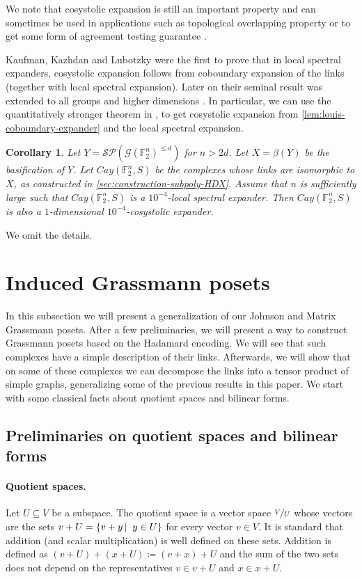 \documentclass[10pt,a4paper]{article}
\newcommand{\prettyref}[1]{\cref{#1}}
\newtheorem{corollary}[theorem]{Corollary}
\theoremstyle{definition}
\theoremstyle{remark}
\newcommand\sett[2]{\left\{ #1 \left| \; \vphantom{#1 #2} \right. #2  \right\}}
\newcommand{\F}{\mathbb{F}}
\renewcommand{\leq}{\leqslant}
\numberwithin{equation}{section}
\let\origparagraph\paragraph
\renewcommand{\paragraph}[1]{\origparagraph{#1.}}
\let\pref=\prettyref
\def\Y{Y}
\def\M{\mathcal{SP}}
\begin{document}
    We note that cosystolic expansion is still an important property and can sometimes be used in applications such as topological overlapping property \cite{DotterrerKW2018} or to get some form of agreement testing guarantee \cite{DiksteinD2023agr}.

Kaufman, Kazhdan and Lubotzky were the first to prove that in local spectral expanders, cosystolic expansion follows from coboundary expansion of the links \cite{KaufmanKL2016} (together with local spectral expansion). Later on their seminal result was extended to all groups and higher dimensions \cite{EvraK2016,KaufmanM2018,KaufmanM2021,KaufmanM2022,DiksteinD2023cbdry}. In particular, we can use the quantitatively stronger theorem in \cite[Theorem 1.2]{DiksteinD2023cbdry}, to get cosystolic expansion from \pref{lem:louis-coboundary-expander} and the local spectral expansion.
\begin{corollary}
    Let \(\Y=\M(\mathcal{G}(\F_2^n)^{\leq d})\) for \(n > 2d\). Let \(X = \beta(\Y)\) be the basification of \(Y\). Let \(Cay(\F_2^n,S)\) be the complexes whose links are isomorphic to \(X\), as constructed in \pref{sec:construction-subpoly-HDX}. Assume that \(n\) is sufficiently large such that \(Cay(\F_2^n,S)\) is a \(10^{-4}\)-local spectral expander. Then \(Cay(\F_2^n,S)\) is also a $1$-dimensional \(10^{-4}\)-cosystolic expander.
\end{corollary}
We omit the details.
 

\section{Induced Grassmann posets} \label{sec:induced-Grassmann}
In this subsection we will present a generalization of our Johnson and Matrix Grassmann posets. After a few preliminaries, we will present a way to construct Grassmann posets based on the Hadamard encoding. We will see that such complexes have a simple description of their links. Afterwards, we will show that on some of these complexes we can decompose the links into a tensor product of simple graphs, generalizing some of the previous results in this paper. We start with some classical facts about quotient spaces and bilinear forms. 
\subsection{Preliminaries on quotient spaces and bilinear forms}
\paragraph{Quotient spaces} Let \(U \subseteq V\) be a subspace. The quotient space is a vector space \(\nicefrac{V}{U}\) whose vectors are the sets \(v+U = \sett{v+y}{y \in U}\) for every vector \(v \in V\). It is standard that addition (and scalar multiplication) is well defined on these sets. Addition is defined as \((v+U) + (x+U) \coloneqq (v+x)+U\) and the sum of the two sets does not depend on the representatives \(v \in v+U\) and \(x \in x+U\).
\end{document}
